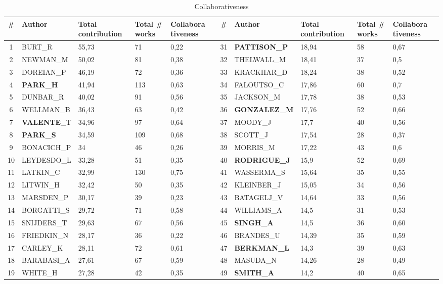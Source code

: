 \documentclass[11pt]{article} %
\begin{document}
\begin{table}
\caption{Collaborativeness} \label{collab}\medskip
\small
\renewcommand{\arraystretch}{0.95}
\small
\begin{tabular}{c|l|p{1cm}|p{1cm}|p{1.5cm}||c|l|p{1cm}|p{1cm}|p{1.5cm}|} 
\# & Author & Total contribution & Total \# works & Collabora tiveness & \# & Author & Total contribution & Total \# works & Collabora tiveness \\ \hline
1& 	BURT\_R& 	55,73& 	71& 	0,22& 	31& 	\textbf{PATTISON\_P}& 	18,94& 	58& 	0,67\\
2& 	NEWMAN\_M& 	50,02& 	81& 	0,38& 	32& 	THELWALL\_M& 	18,41& 	37& 	0,5\\
3& 	DOREIAN\_P& 	46,19& 	72& 	0,36& 	33& 	KRACKHAR\_D& 	18,24& 	38& 	0,52\\
4& 	\textbf{PARK\_H}& 	41,94& 	113& 	0,63& 	34& 	FALOUTSO\_C& 	17,86& 	60& 	0,7\\
5& 	DUNBAR\_R& 	40,02& 	91& 	0,56& 	35& 	JACKSON\_M& 	17,78& 	38& 	0,53\\
6& 	WELLMAN\_B& 	36,43& 	63& 	0,42& 	36& 	\textbf{GONZALEZ\_M}& 	17,76& 	52& 	0,66\\
7& 	\textbf{VALENTE}\_T& 	34,96& 	97& 	0,64& 	37& 	MOODY\_J& 	17,7& 	40& 	0,56\\
8& 	\textbf{PARK\_S}& 	34,59& 	109& 	0,68& 	38& 	SCOTT\_J& 	17,54& 	28& 	0,37\\
9& 	BONACICH\_P& 	34& 	46& 	0,26& 	39& 	MORRIS\_M& 	17,22& 	43& 	0,6\\
10& 	LEYDESDO\_L& 	33,28& 	51& 	0,35& 	40& 	\textbf{RODRIGUE\_J}& 	15,9& 	52& 	0,69\\
11& 	LATKIN\_C& 	32,99& 	130& 	0,75& 	41& 	WASSERMA\_S& 	15,64& 	35& 	0,55\\
12& 	LITWIN\_H& 	32,42& 	50& 	0,35& 	42& 	KLEINBER\_J& 	15,05& 	34& 	0,56\\
13& 	MARSDEN\_P& 	30,17& 	39& 	0,23& 	43& 	BATAGELJ\_V& 	14,64& 	33& 	0,56\\
14& 	BORGATTI\_S& 	29,72& 	71& 	0,58& 	44& 	WILLIAMS\_A& 	14,5& 	31& 	0,53\\
15& 	SNIJDERS\_T& 	29,63& 	67& 	0,56& 	45& 	\textbf{SINGH\_A}& 	14,5& 	36& 	0,60\\
16& 	FRIEDKIN\_N& 	28,17& 	36& 	0,22& 	46& 	BRANDES\_U& 	14,39& 	35& 	0,59\\
17& 	CARLEY\_K& 	28,11& 	72& 	0,61& 	47& 	\textbf{BERKMAN\_L}& 	14,3& 	39& 	0,63\\
18& 	BARABASI\_A& 	27,61& 	67& 	0,59& 	48& 	MASUDA\_N& 	14,26& 	28& 	0,49\\
19& 	WHITE\_H& 	27,28& 	42& 	0,35& 	49& 	\textbf{SMITH\_A}& 	14,2& 	40& 	0,65\\

\end{tabular}
\end{table}
\end{document}
